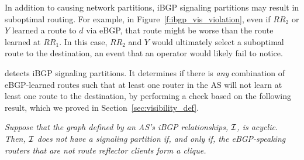 In addition to causing network partitions, iBGP signaling partitions may
result in suboptimal routing.
For example, in Figure~\ref{f:ibgp_vis_violation}, even if $RR_2$ or $Y$
learned a route to $d$ via eBGP, that route might be worse than
the route learned at $RR_1$.  In this case, $RR_2$ and $Y$ would ultimately
select a suboptimal route to the destination, an event that an operator
would likely fail to notice.


%
%

\rcc detects iBGP signaling partitions.
It determines if there is {\em any}
combination of eBGP-learned routes such that at least one router in the
AS will not learn at least one route to the destination, by performing a
check based on the following result, which we proved in
Section~\ref{sec:visibility_def}. 

\vskip 0.1in

{\em Suppose that the graph defined by an AS's iBGP relationships, $\mathcal{I}$, is
acyclic.  Then, $\mathcal{I}$ does not have a signaling partition if, and only
if, the eBGP-speaking routers that are not route reflector clients form
a clique. }
\vskip 0.1in


